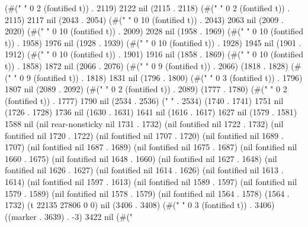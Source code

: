 (#("  " 0 2 (fontified t)) . 2119) 2122 nil (2115 . 2118) (#("  " 0 2 (fontified t)) . 2115) 2117 nil (2043 . 2054) (#("          " 0 10 (fontified t)) . 2043) 2063 nil (2009 . 2020) (#("          " 0 10 (fontified t)) . 2009) 2028 nil (1958 . 1969) (#("          " 0 10 (fontified t)) . 1958) 1976 nil (1928 . 1939) (#("          " 0 10 (fontified t)) . 1928) 1945 nil (1901 . 1912) (#("          " 0 10 (fontified t)) . 1901) 1916 nil (1858 . 1869) (#("          " 0 10 (fontified t)) . 1858) 1872 nil (2066 . 2076) (#("         " 0 9 (fontified t)) . 2066) (1818 . 1828) (#("         " 0 9 (fontified t)) . 1818) 1831 nil (1796 . 1800) (#("   " 0 3 (fontified t)) . 1796) 1807 nil (2089 . 2092) (#("  " 0 2 (fontified t)) . 2089) (1777 . 1780) (#("  " 0 2 (fontified t)) . 1777) 1790 nil (2534 . 2536) (" " . 2534) (1740 . 1741) 1751 nil (1726 . 1728) 1736 nil (1630 . 1631) 1641 nil (1616 . 1617) 1627 nil (1579 . 1581) 1588 nil (nil rear-nonsticky nil 1731 . 1732) (nil fontified nil 1722 . 1732) (nil fontified nil 1720 . 1722) (nil fontified nil 1707 . 1720) (nil fontified nil 1689 . 1707) (nil fontified nil 1687 . 1689) (nil fontified nil 1675 . 1687) (nil fontified nil 1660 . 1675) (nil fontified nil 1648 . 1660) (nil fontified nil 1627 . 1648) (nil fontified nil 1626 . 1627) (nil fontified nil 1614 . 1626) (nil fontified nil 1613 . 1614) (nil fontified nil 1597 . 1613) (nil fontified nil 1589 . 1597) (nil fontified nil 1579 . 1589) (nil fontified nil 1578 . 1579) (nil fontified nil 1564 . 1578) (1564 . 1732) (t 22135 27806 0 0) nil (3406 . 3408) (#("   " 0 3 (fontified t)) . 3406) ((marker . 3639) . -3) 3422 nil (#("
